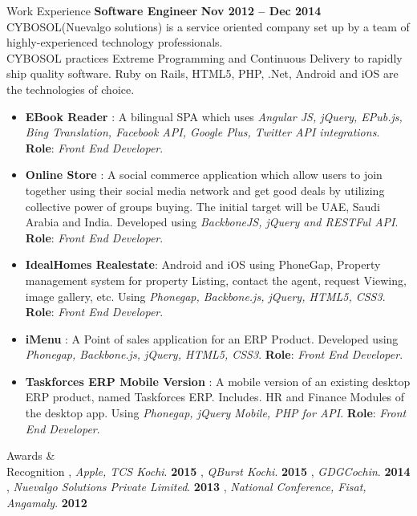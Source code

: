 \documentclass{resume}
\begin{document}
\begin{category}{Work Experience}
  \citemnobullet \textbf{Software Engineer} \hfill \textbf{Nov 2012 -- Dec 2014}
  \citemnobullet CYBOSOL(Nuevalgo solutions) is a service oriented company set up by a team of highly-experienced technology professionals. \\CYBOSOL practices Extreme Programming and Continuous
  Delivery to rapidly ship quality software. Ruby on Rails, HTML5, PHP, .Net, Android and iOS are the technologies of choice.
  \begin{itemize}
  \item \textbf{EBook Reader} : A bilingual SPA which uses {\em Angular JS, jQuery, EPub.js, Bing Translation, Facebook API, Google Plus, Twitter API integrations}. \textbf{Role}: {\em Front End Developer}.  
  \item \textbf{Online Store} : A social commerce application which allow users to join together using their social media network and get good deals by utilizing collective power of groups buying. The initial target will be UAE, Saudi Arabia and India. Developed using {\em BackboneJS, jQuery and RESTFul API}. \textbf{Role}: {\em Front End Developer}.
  \item \textbf{IdealHomes Realestate}: Android and iOS using PhoneGap, Property management system for property Listing, contact the agent, request Viewing, image gallery, etc. Using {\em Phonegap, Backbone.js, jQuery, HTML5, CSS3}. \textbf{Role}: {\em Front End Developer}.
  \item \textbf{iMenu} : A Point of sales application for an ERP Product. Developed using {\em Phonegap, Backbone.js, jQuery, HTML5, CSS3}. \textbf{Role}: {\em Front End Developer}.
  \item \textbf{Taskforces ERP Mobile Version} : A mobile version of an existing desktop ERP product, named Taskforces ERP. Includes. HR and Finance Modules of the desktop app. Using{\em
      Phonegap, jQuery Mobile, PHP for API}. \textbf{Role}: {\em Front End Developer}. 
  \end{itemize}
\end{category}


\begin{category}{Awards \&\\ Recognition}
  , {\em Apple, TCS Kochi}. \hfill \textbf{2015}
  , {\em QBurst Kochi}. \hfill \textbf{2015}
  , {\em GDGCochin}. \hfill \textbf{2014}
  , {\em Nuevalgo Solutions Private Limited}. \hfill \textbf{2013}
  , {\em  National Conference, Fisat, Angamaly}. \hfill \textbf{2012}
\end{category}
\end{document}
